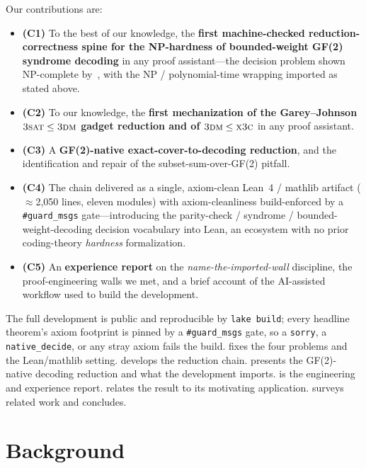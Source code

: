 \documentclass[a4paper,UKenglish,cleveref,autoref]{lipics-v2021}
\begin{document}
Our contributions are:
\begin{itemize}
  \item \textbf{(C1)} To the best of our knowledge, the \textbf{first machine-checked reduction-correctness
    spine for the NP-hardness of bounded-weight GF(2) syndrome decoding} in any proof assistant---the decision
    problem shown NP-complete by~\cite{BMvT78}, with the NP / polynomial-time wrapping imported as stated above.
  \item \textbf{(C2)} To our knowledge, the \textbf{first mechanization of the Garey--Johnson
    $\textsc{3sat} \le \textsc{3dm}$ gadget reduction and of $\textsc{3dm} \le \textsc{x3c}$} in any proof
    assistant.
  \item \textbf{(C3)} A \textbf{GF(2)-native exact-cover-to-decoding reduction}, and the identification and
    repair of the subset-sum-over-GF(2) pitfall.
  \item \textbf{(C4)} The chain delivered as a single, axiom-clean Lean~4 / mathlib artifact
    ($\approx$2{,}050 lines, eleven modules) with axiom-cleanliness build-enforced by a \lstinline{#guard_msgs}
    gate---introducing the parity-check / syndrome / bounded-weight-decoding decision vocabulary into Lean, an
    ecosystem with no prior coding-theory \emph{hardness} formalization.
  \item \textbf{(C5)} An \textbf{experience report} on the \emph{name-the-imported-wall} discipline, the
    proof-engineering walls we met, and a brief account of the AI-assisted workflow used to build the
    development.
\end{itemize}

The full development is public and reproducible by \lstinline{lake build}; every headline theorem's axiom
footprint is pinned by a \lstinline{#guard_msgs} gate, so a \lstinline{sorry}, a \lstinline{native_decide}, or
any stray axiom fails the build.  fixes the four problems and the Lean/mathlib setting.
 develops the reduction chain.  presents the GF(2)-native decoding reduction and
what the development imports.  is the engineering and experience report.  relates
the result to its motivating application.  surveys related work and 
concludes.

\section{Background}\label{sec:bg}
\end{document}

